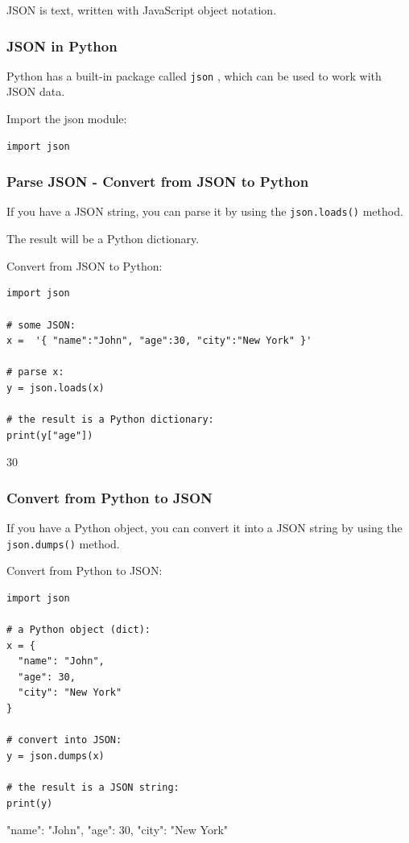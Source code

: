 \documentclass[12pt,a4paper]{article}
\newcommand{\code}[1]{%
	\colorbox{backcolour}{\lstinline{#1}}%
}
\begin{document}
JSON is text, written with JavaScript object notation.

\subsubsection{JSON in Python}

Python has a built-in package called \code{json}, which can be used to
work with JSON data.

\begin{ebox}
Import the json module:
	\begin{lstlisting}
import json
	\end{lstlisting}
\end{ebox}
\subsubsection{Parse JSON - Convert from JSON to Python}

If you have a JSON string, you can parse it by using the \code{json.loads()} method.

\begin{nbox}
The result will be a Python dictionary.
\end{nbox}

\begin{ebox}
Convert from JSON to Python:
	\begin{lstlisting}
import json

# some JSON:
x =  '{ "name":"John", "age":30, "city":"New York" }'

# parse x:
y = json.loads(x)

# the result is a Python dictionary:
print(y["age"])
	\end{lstlisting}
\tcblower
	\begin{vercode}
30
	\end{vercode}
\end{ebox}
\subsubsection{Convert from Python to JSON}

If you have a Python object, you can convert it into a JSON string by using the \code{json.dumps()} method.

\begin{ebox}
Convert from Python to JSON:
	\begin{lstlisting}
import json

# a Python object (dict):
x = {
  "name": "John",
  "age": 30,
  "city": "New York"
}

# convert into JSON:
y = json.dumps(x)

# the result is a JSON string:
print(y)
	\end{lstlisting}
\tcblower
	\begin{vercode}
{"name": "John", "age": 30, "city": "New York"}
	\end{vercode}
\end{ebox}
\end{document}
